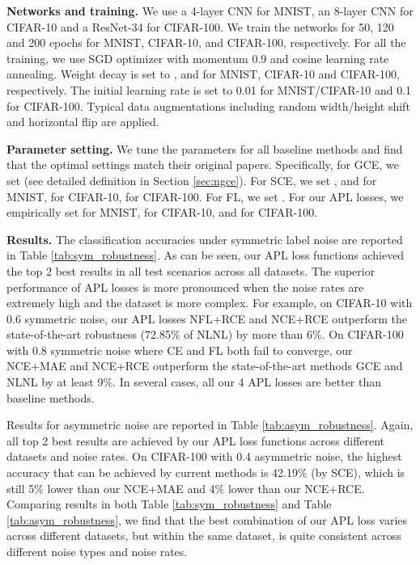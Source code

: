 \documentclass{article}
\begin{document}
\noindent\textbf{Networks and training.}
We use a 4-layer CNN for MNIST, an 8-layer CNN for CIFAR-10 and a ResNet-34 for CIFAR-100. We train the networks for 50, 120 and 200 epochs for MNIST, CIFAR-10, and CIFAR-100, respectively. For all the training, we use SGD optimizer with momentum 0.9 and cosine learning rate annealing. Weight decay is set to ,  and  for MNIST, CIFAR-10 and CIFAR-100, respectively. The initial learning rate is set to 0.01 for MNIST/CIFAR-10 and 0.1 for CIFAR-100. Typical data augmentations including random width/height shift and horizontal flip are applied.

\noindent\textbf{Parameter setting.}
We tune the parameters for all baseline methods and find that the optimal settings match their original papers. Specifically, for GCE, we set  (see detailed definition in Section \ref{sec:ngce}). For SCE, we set , and  for MNIST,  for CIFAR-10,  for CIFAR-100. For FL, we set . For our APL losses, we empirically set  for MNIST,  for CIFAR-10, and  for CIFAR-100.

\noindent\textbf{Results.} The classification accuracies under symmetric label noise are reported in Table \ref{tab:sym_robustness}.
As can be seen, our APL loss functions achieved the top 2 best results in all test scenarios across all datasets. 
The superior performance of APL losses is more pronounced when the noise rates are extremely high and the dataset is more complex. For example, on CIFAR-10 with 0.6 symmetric noise, our APL losses NFL+RCE and NCE+RCE outperform the state-of-the-art robustness (72.85\% of NLNL) by more than 6\%.
On CIFAR-100 with 0.8 symmetric noise where CE and FL both fail to converge, our NCE+MAE and NCE+RCE outperform the state-of-the-art methods GCE and NLNL by at least 9\%. In several cases, all our 4 APL losses are better than baseline methods.

Results for asymmetric noise are reported in Table \ref{tab:asym_robustness}. Again, all top 2 best results are achieved by our APL loss functions across different datasets and noise rates. On CIFAR-100 with 0.4 asymmetric noise, the highest accuracy that can be achieved by current methods is 42.19\% (by SCE), which is still 5\% lower than our NCE+MAE and 4\% lower than our NCE+RCE. Comparing results in both Table \ref{tab:sym_robustness} and Table \ref{tab:asym_robustness}, we find that the best combination of our APL loss varies across different datasets, but within the same dataset, is quite consistent across different noise types and noise rates.
\end{document}
